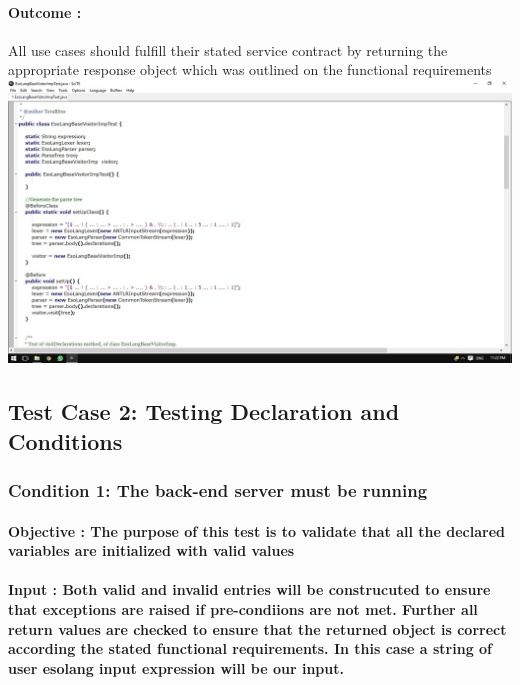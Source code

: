 \documentclass[english]{article}
\begin{document}
			\paragraph{Outcome :}All use cases should fulfill their stated service contract by returning the appropriate response object  which was outlined on the functional requirements\\
			
		
			\includegraphics[width=\linewidth]{test1.jpg}
			\\[12pt]
			 
			
			\subsection{Test Case 2: Testing Declaration and Conditions}
			\subsubsection{Condition 1: The back-end server must be running }
			\paragraph{Objective : The purpose of this test is to validate that all the declared variables are initialized with valid values}
			\paragraph{Input : Both valid and invalid entries will be construcuted to ensure that exceptions are raised if pre-condiions are not met. Further all return values are checked to ensure that the returned object is correct according the stated
			functional requirements. In this case a string of user  esolang input expression will be our input.}
\end{document}
